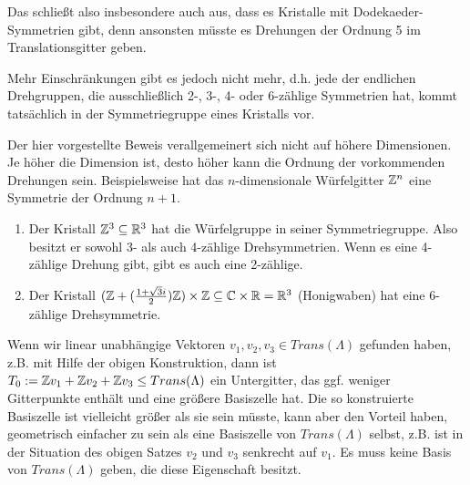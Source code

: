\begin{remark}
Das schließt also insbesondere auch aus, dass es Kristalle mit Dodekaeder-Symmetrien gibt, denn ansonsten müsste es Drehungen der Ordnung 5 im Translationsgitter geben.

Mehr Einschränkungen gibt es jedoch nicht mehr, d.h. jede der endlichen Drehgruppen, die ausschließlich 2-, 3-, 4- oder 6-zählige Symmetrien hat, kommt tatsächlich in der Symmetriegruppe eines Kristalls vor.

Der hier vorgestellte Beweis verallgemeinert sich nicht auf höhere Dimensionen. Je höher die Dimension ist, desto höher kann die Ordnung der vorkommenden Drehungen sein. Beispielsweise hat das $n$-dimensionale Würfelgitter $\mathbb{Z}^n$ eine Symmetrie der Ordnung $n+1$.
\end{remark}

\begin{example}
\begin{enumerate}
\item Der Kristall $\mathbb{Z}^3\subseteq\mathbb{R}^3$ hat die Würfelgruppe in seiner Symmetriegruppe. Also besitzt er sowohl 3- als auch 4-zählige Drehsymmetrien. Wenn es eine 4-zählige Drehung gibt, gibt es auch eine 2-zählige.
\item Der Kristall $(\mathbb{Z}+(\frac{1+\sqrt{3}i}{2})\mathbb{Z}) \times \mathbb{Z} \subseteq \mathbb{C}\times\mathbb{R} = \mathbb{R}^3$ (Honigwaben) hat eine 6-zählige Drehsymmetrie.
\end{enumerate}
\end{example}

\begin{remark}
Wenn wir linear unabhängige Vektoren $v_1,v_2,v_3\in Trans(\Lambda)$ gefunden haben, z.B. mit Hilfe der obigen Konstruktion, dann ist $T_0:=\mathbb{Z} v_1+\mathbb{Z} v_2+\mathbb{Z} v_3 \leq Trans(\Lambda)$ ein Untergitter, das ggf. weniger Gitterpunkte enthält und eine größere Basiszelle hat. Die so konstruierte Basiszelle ist vielleicht größer als sie sein müsste, kann aber den Vorteil haben, geometrisch einfacher zu sein als eine Basiszelle von $Trans(\Lambda)$ selbst, z.B. ist in der Situation des obigen Satzes $v_2$ und $v_3$ senkrecht auf $v_1$. Es muss keine Basis von $Trans(\Lambda)$ geben, die diese Eigenschaft besitzt.
\end{remark}
